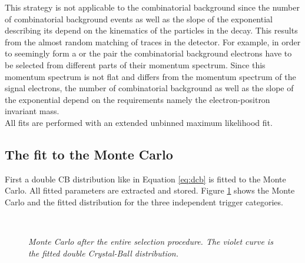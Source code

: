 This strategy is not applicable to the combinatorial background since the number of combinatorial background events as well as the slope of the exponential describing its \PDF depend on the kinematics of the particles in the decay. This results from the almost random matching of traces in the detector. For example, in order to seemingly form a \jpsi or the \epem pair the combinatorial background electrons have to be selected from different parts of their momentum spectrum. Since this momentum spectrum is not flat and differs from the momentum spectrum of the signal electrons, the number of combinatorial background as well as the slope of the exponential depend on the requirements namely the electron-positron invariant mass.\\
All fits are performed with an extended unbinned maximum likelihood fit.\\

\subsection{The fit to the \BdToJPsieeKst Monte Carlo}
First a double CB distribution like in Equation \ref{eq:dcb} is fitted to the \BdToJPsieeKst Monte Carlo. All fitted parameters are extracted and stored. Figure \ref{fig:jpsimc} shows the \BdToJPsieeKst Monte Carlo and the fitted distribution for the three independent trigger categories.
\begin{figure}[ht]
\vspace*{-0.5cm}
\begin{center}
\\
\vspace*{-0.5cm}
\end{center}
\vspace*{-1.cm}
\caption{\textit{\BdToJPsieeKst Monte Carlo after the entire selection procedure. The violet curve is the fitted double Crystal-Ball distribution.}}
\label{fig:jpsimc}
\end{figure}


